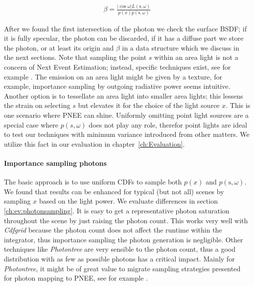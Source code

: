 \begin{align}\label{eq:beta}
\beta = \frac{|\cos{\omega}|L(\text{s}, \omega)}{p(x)p(\text{s}, \omega)}
\end{align}

 After we found the first intersection of the photon we check the surface BSDF; if it is fully specular, the photon can be discarded, if it has a diffuse part we store the photon, or at least its origin and $\beta$ in a data structure which we discuss in the next sections. Note that sampling the point $s$ within an area light is not a concern of Next Event Estimation; instead, specific techniques exist, see for example \parencite{Shirley:1996:MCT:226150.226151, DBLP:journals/cgf/UrenaFK13, DBLP:journals/corr/abs-1805-09048, DBLP:journals/cgf/KokJ92}. The emission on an area light might be given by a texture, for example, importance sampling by outgoing radiative power seems intuitive. Another option is to tessellate an area light into smaller area lights; this lessens the strain on selecting $s$ but elevates it for the choice of the light source $x$. This is one scenario where PNEE can shine. Uniformly omitting point light sources are a special case where $p(s,\omega)$ does not play any role, therefor point lights are ideal to test our techniques with minimum variance introduced from other matters. We utilize this fact in our evaluation in chapter~\ref{ch:Evaluation}.

\paragraph{Importance sampling photons}
\label{ch:photonimportancesample}

The basic approach is to use uniform CDFs to sample both $p(x)$ and $p(\text{s}, \omega)$. We found that results can be enhanced for typical (but not all) scenes by sampling $x$ based on the light power. We evaluate differences in section \ref{ch:ev:photonsampling}. It is easy to get a representative photon saturation throughout the scene by just raising the photon count. This works very well with \textit{Cdfgrid} because the photon count does not affect the runtime within the integrator, thus importance sampling the photon generation is negligible. Other techniques like \textit{Photontree} are very sensible to the photon count, thus a good distribution with as few as possible photons has a critical impact. Mainly for \textit{Photontree}, it might be of great value to migrate sampling strategies presented for photon mapping to PNEE, see for example \parencite{DBLP:conf/rt/PeterP98, DBLP:conf/rt/SuykensW00, DBLP:journals/vc/ZhengZ15}.

